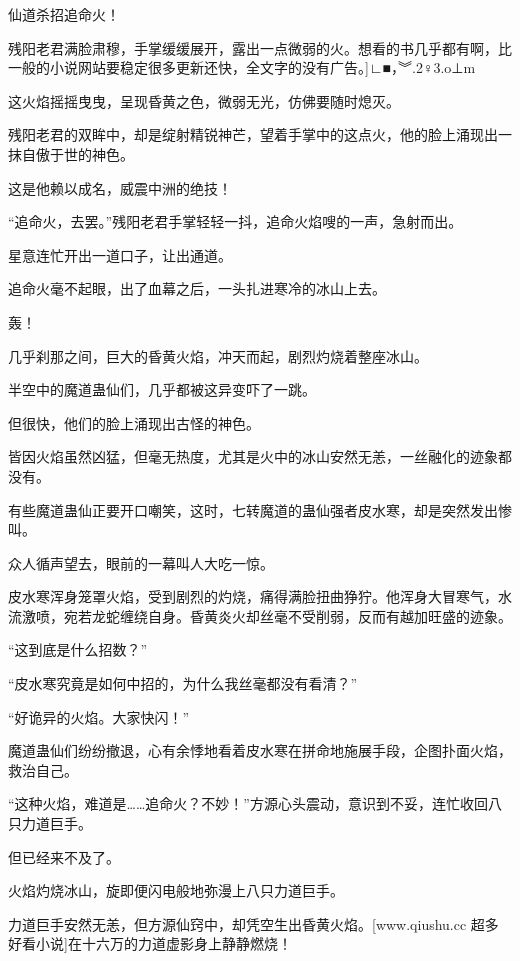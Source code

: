 
\begin{this_body}

仙道杀招追命火！

残阳老君满脸肃穆，手掌缓缓展开，露出一点微弱的火。想看的书几乎都有啊，比一般的小说网站要稳定很多更新还快，全文字的没有广告。]∟■，︾.2♀3.o⊥m

这火焰摇摇曳曳，呈现昏黄之色，微弱无光，仿佛要随时熄灭。

残阳老君的双眸中，却是绽射精锐神芒，望着手掌中的这点火，他的脸上涌现出一抹自傲于世的神色。

这是他赖以成名，威震中洲的绝技！

“追命火，去罢。”残阳老君手掌轻轻一抖，追命火焰嗖的一声，急射而出。

星意连忙开出一道口子，让出通道。

追命火毫不起眼，出了血幕之后，一头扎进寒冷的冰山上去。

轰！

几乎刹那之间，巨大的昏黄火焰，冲天而起，剧烈灼烧着整座冰山。

半空中的魔道蛊仙们，几乎都被这异变吓了一跳。

但很快，他们的脸上涌现出古怪的神色。

皆因火焰虽然凶猛，但毫无热度，尤其是火中的冰山安然无恙，一丝融化的迹象都没有。

有些魔道蛊仙正要开口嘲笑，这时，七转魔道的蛊仙强者皮水寒，却是突然发出惨叫。

众人循声望去，眼前的一幕叫人大吃一惊。

皮水寒浑身笼罩火焰，受到剧烈的灼烧，痛得满脸扭曲狰狞。他浑身大冒寒气，水流激喷，宛若龙蛇缠绕自身。昏黄炎火却丝毫不受削弱，反而有越加旺盛的迹象。

“这到底是什么招数？”

“皮水寒究竟是如何中招的，为什么我丝毫都没有看清？”

“好诡异的火焰。大家快闪！”

魔道蛊仙们纷纷撤退，心有余悸地看着皮水寒在拼命地施展手段，企图扑面火焰，救治自己。

“这种火焰，难道是……追命火？不妙！”方源心头震动，意识到不妥，连忙收回八只力道巨手。

但已经来不及了。

火焰灼烧冰山，旋即便闪电般地弥漫上八只力道巨手。

力道巨手安然无恙，但方源仙窍中，却凭空生出昏黄火焰。[www.qiushu.cc 超多好看小说]在十六万的力道虚影身上静静燃烧！


\end{this_body}
